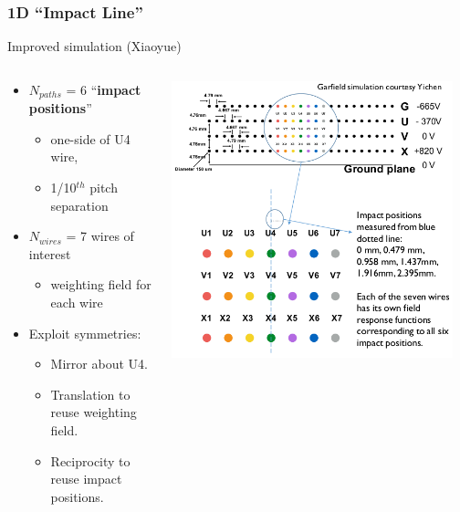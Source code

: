 \documentclass[xcolor=dvipsnames]{beamer}
\begin{document}
\begin{frame}[fragile]
  \frametitle{1D ``Impact Line''}
  \begin{center}
    Improved simulation (Xiaoyue)    
  \end{center}
  \begin{columns}
    \begin{column}{0.55\textwidth}
      \begin{itemize}\footnotesize
      \item $N_{paths}$ = 6 ``\textbf{impact positions}''
        \begin{itemize}\scriptsize
        \item one-side of U4 wire, 
        \item 1/10$^{th}$ pitch separation
        \end{itemize}
      \item $N_{wires}$ = 7 wires of interest
        \begin{itemize}\scriptsize
        \item weighting field for each wire
        \end{itemize}
      \item Exploit symmetries:
        \begin{itemize}\scriptsize
        \item Mirror about U4.
        \item Translation to reuse weighting field.
        \item Reciprocity to reuse impact positions.
        \end{itemize}
      \end{itemize}
    \end{column}
    \begin{column}{0.45\textwidth}
    \includegraphics[width=0.95\textwidth,clip,trim=10mm 0 5mm 0]{xiaoyue-impact-positions.png}
    \end{column}
  \end{columns}
\end{frame}
\end{document}
